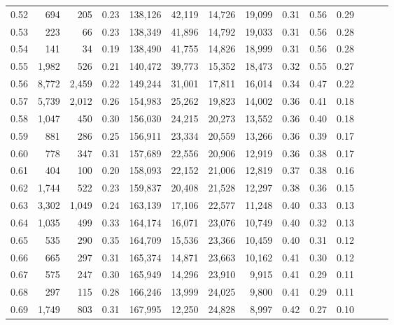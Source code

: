 \begin{tabular}{rrrrrrrrrrrrrr}
0.52 &     694 &    205 &  0.23 &  138,126 &   42,119 &  14,726 &  19,099 &  0.31 &  0.56 &      0.29 \\
0.53 &     223 &     66 &  0.23 &  138,349 &   41,896 &  14,792 &  19,033 &  0.31 &  0.56 &      0.28 \\
0.54 &     141 &     34 &  0.19 &  138,490 &   41,755 &  14,826 &  18,999 &  0.31 &  0.56 &      0.28 \\
0.55 &   1,982 &    526 &  0.21 &  140,472 &   39,773 &  15,352 &  18,473 &  0.32 &  0.55 &      0.27 \\
0.56 &   8,772 &  2,459 &  0.22 &  149,244 &   31,001 &  17,811 &  16,014 &  0.34 &  0.47 &      0.22 \\
0.57 &   5,739 &  2,012 &  0.26 &  154,983 &   25,262 &  19,823 &  14,002 &  0.36 &  0.41 &      0.18 \\
0.58 &   1,047 &    450 &  0.30 &  156,030 &   24,215 &  20,273 &  13,552 &  0.36 &  0.40 &      0.18 \\
0.59 &     881 &    286 &  0.25 &  156,911 &   23,334 &  20,559 &  13,266 &  0.36 &  0.39 &      0.17 \\
0.60 &     778 &    347 &  0.31 &  157,689 &   22,556 &  20,906 &  12,919 &  0.36 &  0.38 &      0.17 \\
0.61 &     404 &    100 &  0.20 &  158,093 &   22,152 &  21,006 &  12,819 &  0.37 &  0.38 &      0.16 \\
0.62 &   1,744 &    522 &  0.23 &  159,837 &   20,408 &  21,528 &  12,297 &  0.38 &  0.36 &      0.15 \\
0.63 &   3,302 &  1,049 &  0.24 &  163,139 &   17,106 &  22,577 &  11,248 &  0.40 &  0.33 &      0.13 \\
0.64 &   1,035 &    499 &  0.33 &  164,174 &   16,071 &  23,076 &  10,749 &  0.40 &  0.32 &      0.13 \\
0.65 &     535 &    290 &  0.35 &  164,709 &   15,536 &  23,366 &  10,459 &  0.40 &  0.31 &      0.12 \\
0.66 &     665 &    297 &  0.31 &  165,374 &   14,871 &  23,663 &  10,162 &  0.41 &  0.30 &      0.12 \\
0.67 &     575 &    247 &  0.30 &  165,949 &   14,296 &  23,910 &   9,915 &  0.41 &  0.29 &      0.11 \\
0.68 &     297 &    115 &  0.28 &  166,246 &   13,999 &  24,025 &   9,800 &  0.41 &  0.29 &      0.11 \\
0.69 &   1,749 &    803 &  0.31 &  167,995 &   12,250 &  24,828 &   8,997 &  0.42 &  0.27 &      0.10 \\

\end{tabular}
